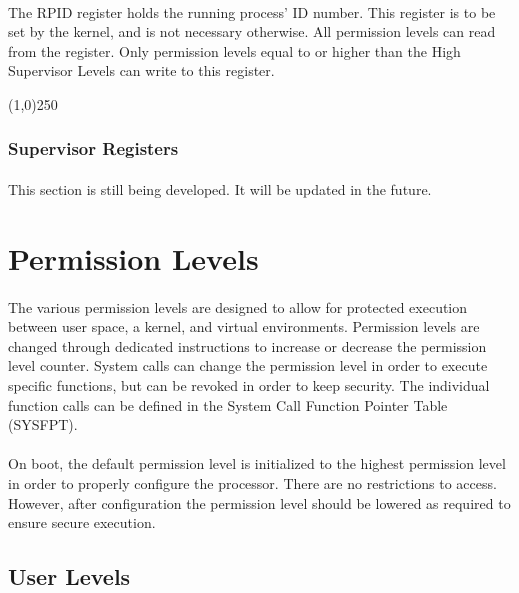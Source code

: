 \documentclass[letterpaper, 11pt]{article}
\begin{document}
\paragraph{} The RPID register holds the running process' ID number. This register
is to be set by the kernel, and is not necessary otherwise. All permission levels
can read from the register. Only permission levels equal to or higher than the High Supervisor Levels can write to this register. 

\begin{center}
	\line(1,0){250}
\end{center}




\clearpage
\subsubsection{Supervisor Registers}
\paragraph{} This section is still being developed. It will be updated in the future.

\clearpage
\section{Permission Levels}
\paragraph{} The various permission levels are designed to allow for protected execution between user space, a kernel, and virtual
environments. Permission levels are changed through dedicated instructions to increase or decrease the permission level counter. System calls
can change the permission level in order to execute specific functions, but can be revoked in order to keep security. The individual function
calls can be defined in the System Call Function Pointer Table (SYSFPT). 
\paragraph{} On boot, the default permission level is initialized to the highest permission level in order to properly configure the processor.
There are no restrictions to access. However, after configuration the permission level should be lowered as required to ensure secure execution.
\subsection{User Levels}
\end{document}
